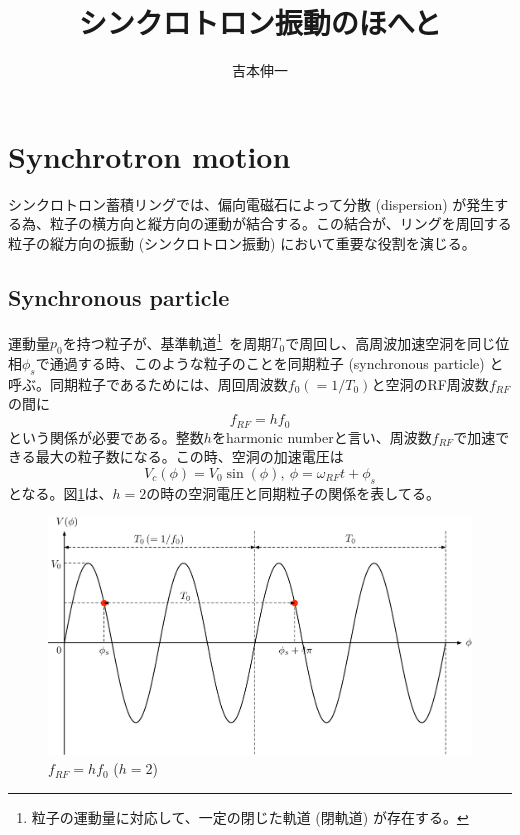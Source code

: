\documentclass[10pt,a4paper]{ltjsarticle}
\begin{document}
\title{シンクロトロン振動のほへと}
\author{吉本伸一}
\maketitle
\tableofcontents
\clearpage

\section{Synchrotron motion}
シンクロトロン蓄積リングでは、偏向電磁石によって分散 (dispersion) が発生する為、粒子の横方向と縦方向の運動が結合する。この結合が、リングを周回する粒子の縦方向の振動 (シンクロトロン振動) において重要な役割を演じる。

\subsection{Synchronous particle}
運動量$p_0$を持つ粒子が、基準軌道\footnote{粒子の運動量に対応して、一定の閉じた軌道 (閉軌道) が存在する。}\ を周期$T_0$で周回し、高周波加速空洞を同じ位相$\phi_s$で通過する時、このような粒子のことを同期粒子 (synchronous particle) と呼ぶ。同期粒子であるためには、周回周波数$f_0 (= 1/T_0)$と空洞のRF周波数$f_{RF}$の間に
%
\begin{equation}
    f_{RF} = h f_0
    \label{harmonic}
\end{equation}
%
という関係が必要である。整数$h$をharmonic numberと言い、周波数$f_{RF}$で加速できる最大の粒子数になる。この時、空洞の加速電圧は
%
\begin{equation}
    V_c (\phi) = V_0 \sin (\phi),\:\phi = \omega_{RF} t + \phi_s
\end{equation}
%
となる。図\ref{synchronous}は、$h=2$の時の空洞電圧と同期粒子の関係を表してる。

\begin{figure}[hbt]
    \begin{center}
      \includegraphics[width=15cm,clip]{synchronous.pdf}
      \caption{$f_{RF} = h f_0$ ($h=2$)}
      \label{synchronous}
    \end{center}
\end{figure}
\end{document}
